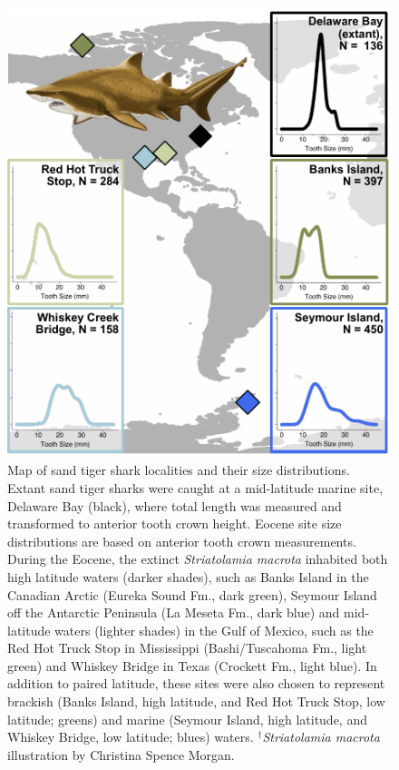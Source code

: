 \documentclass[]{rsos}%
\begin{document}



\clearpage




\begin{figure}
    \centering
    \includegraphics[width=0.5\linewidth]{Shark_Map4C.pdf}
    \caption{Map of sand tiger shark localities and their size distributions. Extant sand tiger sharks were caught at a mid-latitude marine site, Delaware Bay (black), where total length was measured and transformed to anterior tooth crown height.  Eocene site size distributions are based on anterior tooth crown measurements. During the Eocene, the extinct \emph{Striatolamia macrota} inhabited both high latitude waters (darker shades), such as Banks Island in the Canadian Arctic (Eureka Sound Fm., dark green), Seymour Island off the Antarctic Peninsula (La Meseta Fm., dark blue) and mid-latitude waters (lighter shades) in the Gulf of Mexico, such as the Red Hot Truck Stop in Mississippi (Bashi/Tuscahoma Fm., light green) and Whiskey Bridge in Texas (Crockett Fm., light blue). In addition to paired latitude, these sites were also chosen to represent brackish  (Banks Island, high latitude, and Red Hot Truck Stop, low latitude; greens) and marine  (Seymour Island, high latitude, and Whiskey Bridge, low latitude; blues) waters. ${}^\dag$\emph{Striatolamia macrota} illustration by Christina Spence Morgan.}
\label{fig:map}
\end{figure}
\end{document}

